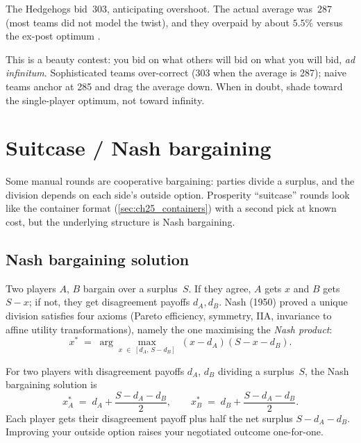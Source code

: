 The Hedgehogs bid~$303$, anticipating overshoot.  The actual
average was~$287$ (most teams did not model the twist), and they
overpaid by about $5.5\%$ versus the ex-post optimum
\citep{frankfurtHedgehogs2025imcP3}.

\begin{pitfallbox}
This is a beauty contest: you bid on what others will bid on what
you will bid, \emph{ad infinitum}.  Sophisticated teams over-correct
(303 when the average is 287); naive teams anchor at 285 and drag
the average down.  When in doubt, shade toward the single-player
optimum, not toward infinity.
\end{pitfallbox}


\section{Suitcase / Nash bargaining}
\label{sec:ch25_suitcases}

Some manual rounds are cooperative bargaining: parties divide a
surplus, and the division depends on each side's outside option.
Prosperity ``suitcase'' rounds look like the container format
(\cref{sec:ch25_containers}) with a second pick at known cost, but
the underlying structure is Nash bargaining.

\subsection{Nash bargaining solution}

Two players $A$, $B$ bargain over a surplus~$S$.  If they agree,
$A$ gets $x$ and $B$ gets $S - x$; if not, they get disagreement
payoffs $d_A, d_B$.  Nash (1950) proved a unique division satisfies
four axioms (Pareto efficiency, symmetry, IIA, invariance to affine
utility transformations), namely the one maximising the \emph{Nash product}:
\begin{equation}
  x^*
  \;=\;
  \arg\max_{x \;\in\; [d_A,\, S - d_B]}
  \;
  (x - d_A)(S - x - d_B).
  \label{eq:ch25_nash_bargaining}
\end{equation}

\begin{keyfactbox}
For two players with disagreement payoffs $d_A$, $d_B$
dividing a surplus~$S$, the Nash bargaining solution is
\[
  x^*_A \;=\; d_A + \frac{S - d_A - d_B}{2},
  \qquad
  x^*_B \;=\; d_B + \frac{S - d_A - d_B}{2}.
\]
Each player gets their disagreement payoff plus half the net
surplus $S - d_A - d_B$.  Improving your outside option raises
your negotiated outcome one-for-one.
\end{keyfactbox}

